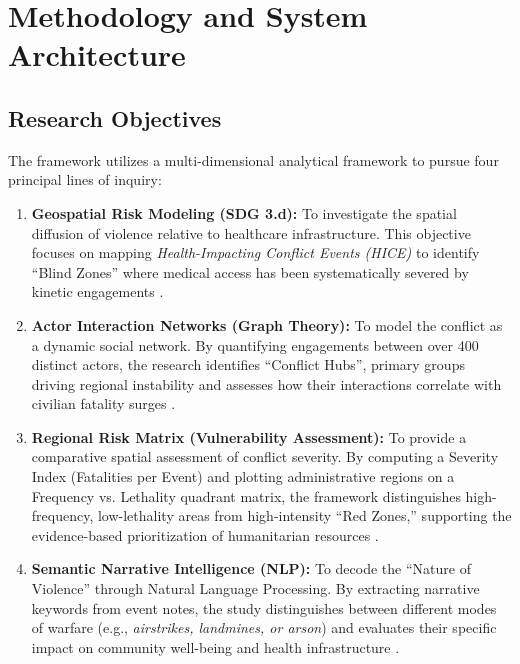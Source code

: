 \documentclass[conference]{IEEEtran}
\begin{document}
\section{Methodology and System Architecture}

\subsection{Research Objectives}

The framework utilizes a multi-dimensional analytical framework to pursue four principal lines of inquiry:
\begin{enumerate}
    \item \textbf{Geospatial Risk Modeling (SDG 3.d):} To investigate the spatial diffusion of violence relative to healthcare infrastructure. This objective focuses on mapping \textit{Health-Impacting Conflict Events (HICE)} to identify ``Blind Zones'' where medical access has been systematically severed by kinetic engagements \cite{who_myanmar_2025,ocha_myanmar_2025}.

    \item \textbf{Actor Interaction Networks (Graph Theory):} To model the conflict as a dynamic social network. By quantifying engagements between over 400 distinct actors, the research identifies ``Conflict Hubs'', primary groups driving regional instability and assesses how their interactions correlate with civilian fatality surges \cite{tkacova2023conflict}.

    \item \textbf{Regional Risk Matrix (Vulnerability Assessment):} To provide a comparative spatial assessment of conflict severity. By computing a Severity Index (Fatalities per Event) and plotting administrative regions on a Frequency vs. Lethality quadrant matrix, the framework distinguishes high-frequency, low-lethality areas from high-intensity ``Red Zones,'' supporting the evidence-based prioritization of humanitarian resources \cite{shcc2024myanmar}.

    \item \textbf{Semantic Narrative Intelligence (NLP):} To decode the ``Nature of Violence'' through Natural Language Processing. By extracting narrative keywords from event notes, the study distinguishes between different modes of warfare (e.g., \textit{airstrikes, landmines, or arson}) and evaluates their specific impact on community well-being and health infrastructure \cite{acled_nlp_notes}.
\end{enumerate}
\end{document}
